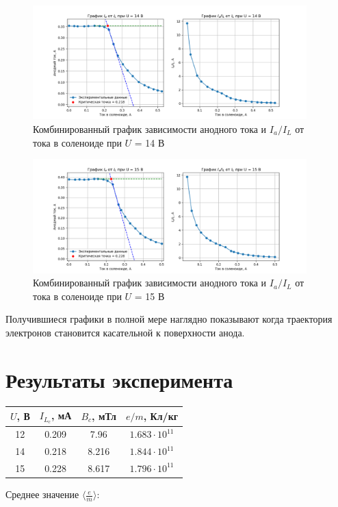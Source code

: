 \documentclass{article}%
\begin{document}
%


\begin{figure}[h!]%
\centering%
\includegraphics[width=400px]{combined_plot_U_14.png}%
\caption{Комбинированный график зависимости анодного тока и $I_a/I_L$ от тока в соленоиде при $U$ = 14 В}%
\end{figure}

%


\begin{figure}[h!]%
\centering%
\includegraphics[width=400px]{combined_plot_U_15.png}%
\caption{Комбинированный график зависимости анодного тока и $I_a/I_L$ от тока в соленоиде при $U$ = 15 В}%
\end{figure}

%
Получившиеся графики в полной мере наглядно показывают когда траектория электронов становится касательной к поверхности анода.%
\section{Результаты эксперимента}%
\label{sec:}%
\begin{tabular}{|c|c|c|c|}%
\hline%
$U$, В&$I_{L_c}$, мА&$B_c$, мТл&$e/m$, Кл/кг\\%
\hline%
12&0.209&7.96&$1.683 \cdot 10^{11}$\\%
\hline%
14&0.218&8.216&$1.844 \cdot 10^{11}$\\%
\hline%
15&0.228&8.617&$1.796 \cdot 10^{11}$\\%
\hline%
\end{tabular}

%
 \vspace{0.5cm} Среднее значение $\langle \frac{e}{m} \rangle$: %
\end{document}
